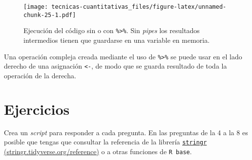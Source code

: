 \documentclass[
]{book}
\newenvironment{Shaded}{\begin{snugshade}}{\end{snugshade}}
\newcommand{\DataTypeTok}[1]{\textcolor[rgb]{0.13,0.29,0.53}{#1}}
\newcommand{\DecValTok}[1]{\textcolor[rgb]{0.00,0.00,0.81}{#1}}
\newcommand{\KeywordTok}[1]{\textcolor[rgb]{0.13,0.29,0.53}{\textbf{#1}}}
\newcommand{\NormalTok}[1]{#1}
\newcommand{\OperatorTok}[1]{\textcolor[rgb]{0.81,0.36,0.00}{\textbf{#1}}}
\newcommand{\StringTok}[1]{\textcolor[rgb]{0.31,0.60,0.02}{#1}}
\begin{document}
\begin{figure}
\centering
\texttt{[image: tecnicas-cuantitativas\_files/figure-latex/unnamed-chunk-25-1.pdf]}
\caption{\label{fig:unnamed-chunk-25}Ejecución del código sin o con \texttt{\%\textgreater{}\%}. Sin \emph{pipes} los resultados intermedios tienen que guardarse en una variable en memoria.}
\end{figure}

Una operación compleja creada mediante el uso de \texttt{\%\textgreater{}\%} se puede usar en el lado derecho de una asignación \texttt{\textless{}-}, de modo que se guarda resultado de toda la operación de la derecha.

\begin{Shaded}
\end{Shaded}

\hypertarget{ejercicios}{%
\section{Ejercicios}\label{ejercicios}}

Crea un \emph{script} para responder a cada pregunta. En las preguntas de la 4 a la 8 es posible que tengas que consultar la referencia de la librería \href{https://stringr.tidyverse.org/reference/index.html}{\texttt{stringr} (stringr.tidyverse.org/reference)} o a otras funciones de \texttt{R\ base}.
\end{document}
